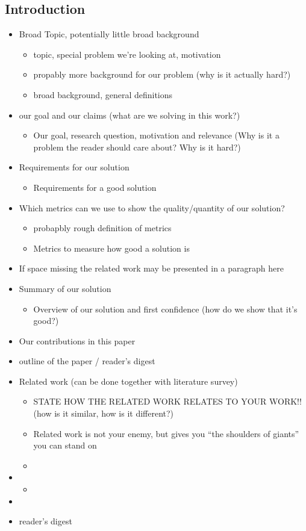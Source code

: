 \documentclass{article}
\begin{document}
\subsection{Introduction}
\begin{itemize}
	\item Broad Topic, potentially little broad background
	\begin{itemize}
		\item topic, special problem we're looking at, motivation
		\item propably more background for our problem (why is it actually hard?) 
		\item broad background, general definitions
	\end{itemize}
	\item our goal and our claims (what are we solving in this work?)
	\begin{itemize}
		\item Our goal, research question, motivation and relevance (Why is it a problem the reader should care about? Why is it hard?)
	\end{itemize}
	\item Requirements for our solution
	\begin{itemize}
		\item Requirements for a good solution
	\end{itemize}
	\item Which metrics can we use to show the quality/quantity of our solution?
	\begin{itemize}
		\item probapbly rough definition of metrics
		\item Metrics to measure how good a solution is
	\end{itemize}
	\item If space missing the related work may be presented in a paragraph here
	\item Summary of our solution
	\begin{itemize}
		\item Overview of our solution and first confidence (how do we show that it's good?)
	\end{itemize}
	\item Our contributions in this paper
	\item outline of the paper / reader's digest
	\item Related work (can be done together with literature survey)
	\begin{itemize}
		\item STATE HOW THE RELATED WORK RELATES TO YOUR WORK!! (how is it similar, how is it different?)
		\item Related work is not your enemy, but gives you ``the shoulders of giants'' you can stand on
		\item 
	\end{itemize}
	\item 
	\begin{itemize}
		\item 
	\end{itemize}
	\item 
	\item reader's digest
\end{itemize}
\end{document}
